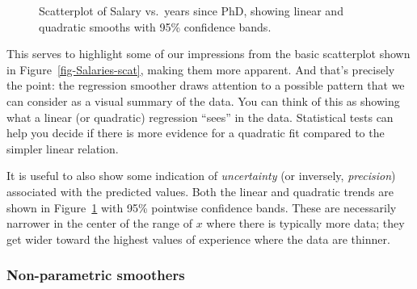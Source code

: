 \documentclass[
  letterpaper,
  10pt,
  krantz2]{krantz}
\begin{document}
\begin{figure}[H]


\caption{\label{fig-Salaries-lm}Scatterplot of Salary vs.~years since
PhD, showing linear and quadratic smooths with 95\% confidence bands.}

\end{figure}%

This serves to highlight some of our impressions from the basic
scatterplot shown in Figure~\ref{fig-Salaries-scat}, making them more
apparent. And that's precisely the point: the regression smoother draws
attention to a possible pattern that we can consider as a visual summary
of the data. You can think of this as showing what a linear (or
quadratic) regression ``sees'' in the data. Statistical tests can help
you decide if there is more evidence for a quadratic fit compared to the
simpler linear relation.

It is useful to also show some indication of \emph{uncertainty} (or
inversely, \emph{precision}) associated with the predicted values. Both
the linear and quadratic trends are shown in
Figure~\ref{fig-Salaries-lm} with 95\% pointwise confidence bands. These
are necessarily narrower in the center of the range of \(x\) where there
is typically more data; they get wider toward the highest values of
experience where the data are thinner.

\subsubsection*{Non-parametric
smoothers}\label{non-parametric-smoothers}
\end{document}
